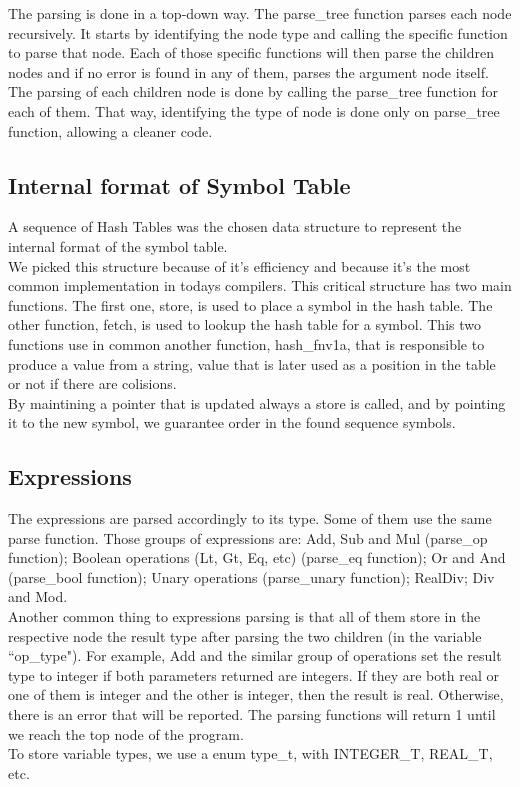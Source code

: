\documentclass[12pt]{article}
\begin{document}
The parsing is done in a top-down way. The parse\_tree function parses each node recursively. It starts by identifying the node type and calling the specific function to parse that node. Each of those specific functions will then parse the children nodes and if no error is found in any of them, parses the argument node itself. The parsing of each children node is done by calling the parse\_tree function for each of them. That way, identifying the type of node is done only on parse\_tree function, allowing a cleaner code.\\

\subsection{Internal format of Symbol Table}

A sequence of Hash Tables was the chosen data structure to represent the internal format of the symbol table. \\
We picked this structure because of it's efficiency and because it's the most common implementation in todays compilers. This critical structure has two main functions. The first one, store, is used to place a symbol in the hash table. The other function, fetch, is used to lookup the hash table for a symbol. This two functions use in common another function, hash\_fnv1a, that is responsible to produce a value from a string, value that is later used as a position in the table or not if there are colisions. \\
By maintining a pointer that is updated always a store is called, and by pointing it to the new symbol, we guarantee order in the found sequence symbols. \\

\subsection{Expressions}

The expressions are parsed accordingly to its type. Some of them use the same parse function. Those groups of expressions are: Add, Sub and Mul (parse\_op function); Boolean operations (Lt, Gt, Eq, etc) (parse\_eq function); Or and And (parse\_bool function); Unary operations (parse\_unary function); RealDiv; Div and Mod.\\
Another common thing to expressions parsing is that all of them store in the respective node the result type after parsing the two children (in the variable ``op\_type"). For example, Add and the similar group of operations set the result type to integer if both parameters returned are integers. If they are both real or one of them is integer and the other is integer, then the result is real. Otherwise, there is an error that will be reported. The parsing functions will return 1 until we reach the top node of the program.\\
To store variable types, we use a enum type\_t, with INTEGER\_T, REAL\_T, etc.\\
\end{document}
